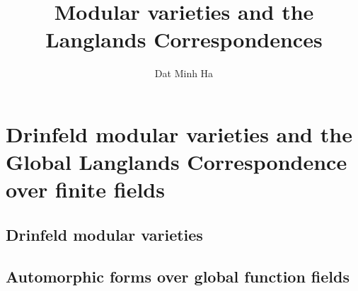

\setcounter{section}{-1}





	\title{Modular varieties and the Langlands Correspondences}
	
	\author{Dat Minh Ha}
	\maketitle
	
	\begin{abstract}
	    
	\end{abstract}
	
	{
      \hypersetup{} 
      \dominitoc
      \tableofcontents %
    }
    
    \part{Drinfeld modular varieties and the Global Langlands Correspondence over finite fields}
        \chapter{Drinfeld modular varieties}
            \begin{abstract}
                
            \end{abstract}
            
            \minitoc
            
            
            
            
            
            
            
            
            
        \chapter{Automorphic forms over global function fields}
        
